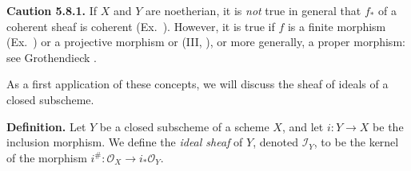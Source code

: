 {\medskip
\noindent\hypertarget{result-II-5.8.1}{}\textbf{Caution 5.8.1.} If $X$ and $Y$ are noetherian, it is \emph{not} true in general that $f_*$ of a coherent sheaf is coherent (Ex.~). However, it is true if $f$ is a finite morphism (Ex.~) or a projective morphism  or (III, ), or more generally, a proper morphism: see Grothendieck .

\medskip
As a first application of these concepts, we will discuss the sheaf of ideals of a closed subscheme.

\medskip
\noindent\textbf{Definition.} Let $Y$ be a closed subscheme of a scheme $X$, and let $i\colon Y\to X$ be the inclusion morphism. We define the \emph{ideal sheaf} of $Y$, denoted $\mathcal I_Y$, to be the kernel of the morphism $i^\#\colon\mathcal O_X\to i_*\mathcal O_Y$.
}
